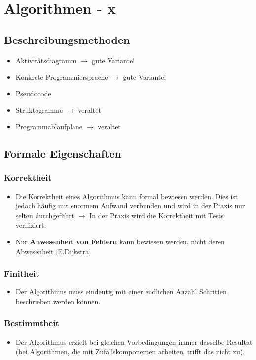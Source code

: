\section{Algorithmen - x}

\subsection{Beschreibungsmethoden}
\begin{itemize}
	\item Aktivitätsdiagramm $\rightarrow$ gute Variante!
	\item Konkrete Programmiersprache $\rightarrow$ gute Variante!
	\item Pseudocode
	\item Struktogramme $\rightarrow$ veraltet
	\item Programmablaufpläne $\rightarrow$ veraltet
\end{itemize}

\subsection{Formale Eigenschaften}
\subsubsection{Korrektheit}
    \begin{itemize}
	    \item Die Korrektheit eines Algorithmus kann formal bewiesen werden. Dies ist jedoch häufig mit enormem Aufwand verbunden und wird in der Praxis nur selten durchgeführt $\rightarrow$ In der Praxis wird die Korrektheit mit Tests verifiziert.
	    \item Nur \textbf{Anwesenheit von Fehlern} kann bewiesen werden, nicht deren Abwesenheit [E.Dijkstra]
    \end{itemize}
\subsubsection{Finitheit}
    \begin{itemize}
	    \item Der Algorithmus muss eindeutig mit einer endlichen Anzahl Schritten beschrieben werden können.
    \end{itemize}
\subsubsection{Bestimmtheit}
    \begin{itemize}
	    \item Der Algorithmus erzielt bei gleichen Vorbedingungen immer dasselbe Resultat (bei Algorithmen, die mit Zufallskomponenten arbeiten, trifft das nicht zu).
    \end{itemize}
